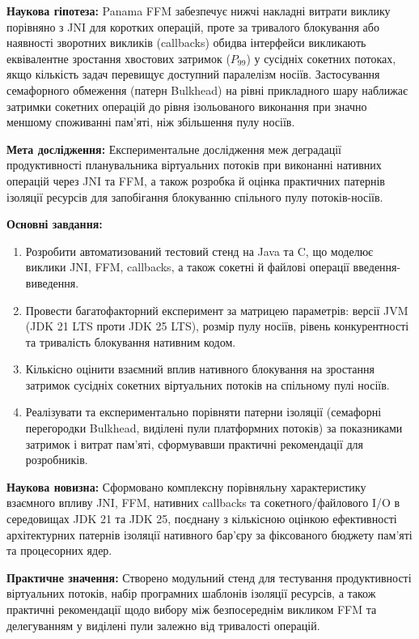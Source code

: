 \textbf{Наукова гіпотеза:} Panama FFM забезпечує нижчі накладні витрати виклику порівняно з JNI для коротких операцій, проте за тривалого блокування або наявності зворотних викликів (callbacks) обидва інтерфейси викликають еквівалентне зростання хвостових затримок ($P_{99}$) у сусідніх сокетних потоках, якщо кількість задач перевищує доступний паралелізм носіїв. Застосування семафорного обмеження (патерн Bulkhead) на рівні прикладного шару наближає затримки сокетних операцій до рівня ізольованого виконання при значно меншому споживанні пам'яті, ніж збільшення пулу носіїв.

\textbf{Мета дослідження:} Експериментальне дослідження меж деградації продуктивності планувальника віртуальних потоків при виконанні нативних операцій через JNI та FFM, а також розробка й оцінка практичних патернів ізоляції ресурсів для запобігання блокуванню спільного пулу потоків-носіїв.

\textbf{Основні завдання:}
\begin{enumerate}[wide]
    \item Розробити автоматизований тестовий стенд на Java та C, що моделює виклики JNI, FFM, callbacks, а також сокетні й файлові операції введення-виведення.
    \item Провести багатофакторний експеримент за матрицею параметрів: версії JVM (JDK 21 LTS проти JDK 25 LTS), розмір пулу носіїв, рівень конкурентності та тривалість блокування нативним кодом.
    \item Кількісно оцінити взаємний вплив нативного блокування на зростання затримок сусідніх сокетних віртуальних потоків на спільному пулі носіїв.
    \item Реалізувати та експериментально порівняти патерни ізоляції (семафорні перегородки Bulkhead, виділені пули платформних потоків) за показниками затримок і витрат пам'яті, сформувавши практичні рекомендації для розробників.
\end{enumerate}

\textbf{Наукова новизна:} Сформовано комплексну порівняльну характеристику взаємного впливу JNI, FFM, нативних callbacks та сокетного/файлового I/O в середовищах JDK 21 та JDK 25, поєднану з кількісною оцінкою ефективності архітектурних патернів ізоляції нативного бар'єру за фіксованого бюджету пам'яті та процесорних ядер.

\textbf{Практичне значення:} Створено модульний стенд для тестування продуктивності віртуальних потоків, набір програмних шаблонів ізоляції ресурсів, а також практичні рекомендації щодо вибору між безпосереднім викликом FFM та делегуванням у виділені пули залежно від тривалості операцій.


